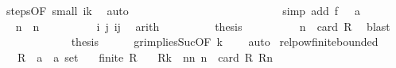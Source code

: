 \begin{isabellebody}
\ steps{\isacharbrackleft}{\kern0pt}OF\ small{\isacharbrackright}{\kern0pt}\ {\isacartoucheopen}i{\isacharless}{\kern0pt}k{\isacartoucheclose}\ \isamarkupfalse%
\ auto\isanewline
\ \ \ \ \ \ \ \ \ \ \isamarkupfalse%
\isanewline
\ \ \ \ \ \ \ \ \isamarkupfalse%
\isanewline
\ \ \ \ \ \ \isamarkupfalse%
\ {\isacharparenleft}{\kern0pt}simp\ add{\isacharcolon}{\kern0pt}\ {\isacartoucheopen}f\ {}\ {\isacharequal}{\kern0pt}\ a{\isacartoucheclose}{\isacharparenright}{\kern0pt}\isanewline
\ \ \ \ \ \ \isamarkupfalse%
\ \isamarkupfalse%
\ {\isachardoublequoteopen}{\isacharquery}{\kern0pt}n\ {\isasymle}\ n{\isachardoublequoteclose}\isanewline
\ \ \ \ \ \ \ \ \isamarkupfalse%
\ i\ j\ ij\ \isamarkupfalse%
\ arith\isanewline
\ \ \ \ \ \ \isamarkupfalse%
\ \isamarkupfalse%
\ {\isacharquery}{\kern0pt}thesis\isanewline
\ \ \ \ \ \ \ \ \isamarkupfalse%
\ {\isacartoucheopen}n\ {\isacharequal}{\kern0pt}\ card\ R{\isacartoucheclose}\ \isamarkupfalse%
\ blast\isanewline
\ \ \ \ \isamarkupfalse%
\isanewline
\ \ \isamarkupfalse%
\isanewline
\ \ \isamarkupfalse%
\ \isamarkupfalse%
\ {\isacharquery}{\kern0pt}thesis\isanewline
\ \ \ \ \isamarkupfalse%
\ gr{}{\isacharunderscore}{\kern0pt}implies{\isacharunderscore}{\kern0pt}Suc{\isacharbrackleft}{\kern0pt}OF\ {\isacartoucheopen}k\ {\isachargreater}{\kern0pt}\ {}{\isacartoucheclose}{\isacharbrackright}{\kern0pt}\ \isamarkupfalse%
\ auto\isanewline
{}\isamarkupfalse%
%
\endisatagproof
{\isafoldproof}%
%
\isadelimproof
\isanewline
%
\endisadelimproof
\isanewline
{}\isamarkupfalse%
\ relpow{\isacharunderscore}{\kern0pt}finite{\isacharunderscore}{\kern0pt}bounded{\isacharcolon}{\kern0pt}\isanewline
\ \ \ R\ {\isacharcolon}{\kern0pt}{\isacharcolon}{\kern0pt}\ {\isachardoublequoteopen}{\isacharparenleft}{\kern0pt}{\isacharprime}{\kern0pt}a\ {\isasymtimes}\ {\isacharprime}{\kern0pt}a{\isacharparenright}{\kern0pt}\ set{\isachardoublequoteclose}\isanewline
\ \ \ {\isachardoublequoteopen}finite\ R{\isachardoublequoteclose}\isanewline
\ \ \ {\isachardoublequoteopen}R{\isacharcircum}{\kern0pt}{\isacharcircum}{\kern0pt}k\ {\isasymsubseteq}\ {\isacharparenleft}{\kern0pt}{\isasymUnion}n{\isasymin}{\isacharbraceleft}{\kern0pt}n{\isachardot}{\kern0pt}\ n\ {\isasymle}\ card\ R{\isacharbraceright}{\kern0pt}{\isachardot}{\kern0pt}\ R{\isacharcircum}{\kern0pt}{\isacharcircum}{\kern0pt}n{\isacharparenright}{\kern0pt}{\isachardoublequoteclose}\isanewline

\end{isabellebody}
